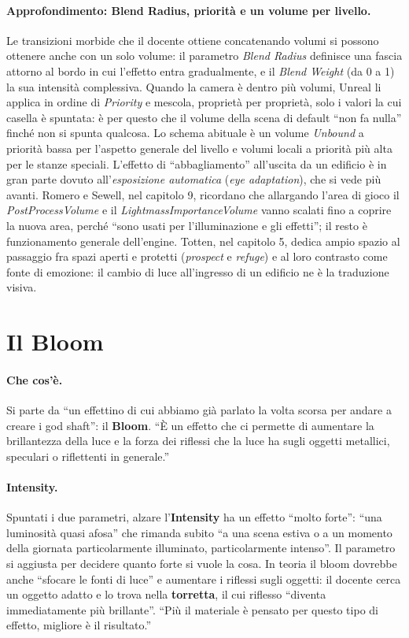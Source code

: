 \paragraph{Approfondimento: Blend Radius, priorità e un volume per livello.} Le transizioni
morbide che il docente ottiene concatenando volumi si possono ottenere anche con un solo
volume: il parametro \emph{Blend Radius} definisce una fascia attorno al bordo in cui
l'effetto entra gradualmente, e il \emph{Blend Weight} (da 0 a 1) la sua intensità
complessiva. Quando la camera è dentro più volumi, Unreal li applica in ordine di
\emph{Priority} e mescola, proprietà per proprietà, solo i valori la cui casella è spuntata:
è per questo che il volume della scena di default ``non fa nulla'' finché non si spunta
qualcosa. Lo schema abituale è un volume \emph{Unbound} a priorità bassa per l'aspetto
generale del livello e volumi locali a priorità più alta per le stanze speciali. L'effetto di
``abbagliamento'' all'uscita da un edificio è in gran parte dovuto all'\emph{esposizione
automatica} (\emph{eye adaptation}), che si vede più avanti. Romero e Sewell, nel capitolo 9,
ricordano che allargando l'area di gioco il \emph{PostProcessVolume} e il
\emph{LightmassImportanceVolume} vanno scalati fino a coprire la nuova area, perché ``sono
usati per l'illuminazione e gli effetti''; il resto è funzionamento generale dell'engine.
Totten, nel capitolo 5, dedica ampio spazio al passaggio fra spazi aperti e protetti
(\emph{prospect} e \emph{refuge}) e al loro contrasto come fonte di emozione: il cambio di
luce all'ingresso di un edificio ne è la traduzione visiva.

\section{Il Bloom}
\label{ue16:sec:bloom}

\paragraph{Che cos'è.} Si parte da ``un effettino di cui abbiamo già parlato la volta scorsa
per andare a creare i god shaft'': il \textbf{Bloom}. ``È un effetto che ci permette di
aumentare la brillantezza della luce e la forza dei riflessi che la luce ha sugli oggetti
metallici, speculari o riflettenti in generale.''

\paragraph{Intensity.} Spuntati i due parametri, alzare l'\textbf{Intensity} ha un effetto
``molto forte'': ``una luminosità quasi afosa'' che rimanda subito ``a una scena estiva o a un
momento della giornata particolarmente illuminato, particolarmente intenso''. Il parametro si
aggiusta per decidere quanto forte si vuole la cosa. In teoria il bloom dovrebbe anche
``sfocare le fonti di luce'' e aumentare i riflessi sugli oggetti: il docente cerca un oggetto
adatto e lo trova nella \textbf{torretta}, il cui riflesso ``diventa immediatamente più
brillante''. ``Più il materiale è pensato per questo tipo di effetto, migliore è il
risultato.''

